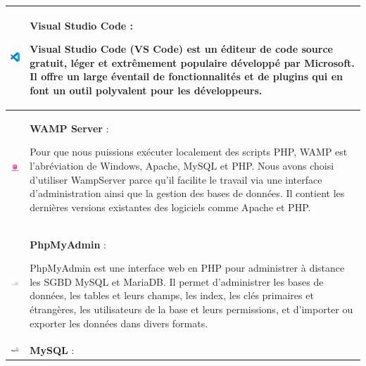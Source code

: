 \documentclass{article}
\begin{document}
                    \begin{table}[h!]
                        \centering
                        \begin{tabular}{|m{2cm}|m{12cm}|}
                            \hline
                            \includegraphics[width=2cm]{assets/logos/vscode.png} &
                            \textbf{Visual Studio Code} :
                            
                            Visual Studio Code (VS Code) est un éditeur de code source gratuit, léger et extrêmement populaire développé par Microsoft. Il offre un large éventail de fonctionnalités et de plugins qui en font un outil polyvalent pour les développeurs. \\
                            \hline
                            \includegraphics[width=2cm]{assets/logos/wamp.jpg} &
                            \textbf{WAMP Server} :
                            
                            Pour que nous puissions exécuter localement des scripts PHP, WAMP est l'abréviation de Windows, Apache, MySQL et PHP. Nous avons choisi d'utiliser WampServer parce qu'il facilite le travail via une interface d'administration ainsi que la gestion des bases de données. Il contient les dernières versions existantes des logiciels comme Apache et PHP. \\
                            \hline
                            \includegraphics[width=2cm]{assets/logos/OIP.jpg} &
                            \textbf{PhpMyAdmin} :
                            
                            PhpMyAdmin est une interface web en PHP pour administrer à distance les SGBD MySQL et MariaDB. Il permet d'administrer les bases de données, les tables et leurs champs, les index, les clés primaires et étrangères, les utilisateurs de la base et leurs permissions, et d'importer ou exporter les données dans divers formats. \\
                            \hline
                            \includegraphics[width=2cm]{assets/logos/mysql_PNG22.png} &
                            \textbf{MySQL} :
                            

\end{tabular}
\end{table}
\end{document}
